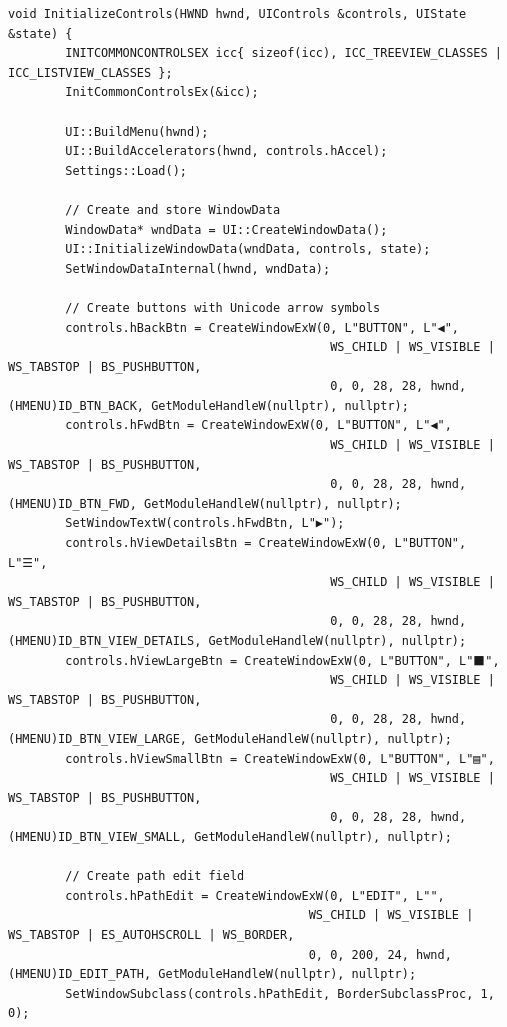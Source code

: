\begin{lstlisting}[style=CodeListing]
    void InitializeControls(HWND hwnd, UIControls &controls, UIState &state) {
        INITCOMMONCONTROLSEX icc{ sizeof(icc), ICC_TREEVIEW_CLASSES | ICC_LISTVIEW_CLASSES };
        InitCommonControlsEx(&icc);
        
        UI::BuildMenu(hwnd);
        UI::BuildAccelerators(hwnd, controls.hAccel);
        Settings::Load();
        
        // Create and store WindowData
        WindowData* wndData = UI::CreateWindowData();
        UI::InitializeWindowData(wndData, controls, state);
        SetWindowDataInternal(hwnd, wndData);
        
        // Create buttons with Unicode arrow symbols
        controls.hBackBtn = CreateWindowExW(0, L"BUTTON", L"◀", 
                                             WS_CHILD | WS_VISIBLE | WS_TABSTOP | BS_PUSHBUTTON,
                                             0, 0, 28, 28, hwnd, (HMENU)ID_BTN_BACK, GetModuleHandleW(nullptr), nullptr);
        controls.hFwdBtn = CreateWindowExW(0, L"BUTTON", L"◀",
                                             WS_CHILD | WS_VISIBLE | WS_TABSTOP | BS_PUSHBUTTON,
                                             0, 0, 28, 28, hwnd, (HMENU)ID_BTN_FWD, GetModuleHandleW(nullptr), nullptr);
        SetWindowTextW(controls.hFwdBtn, L"▶");
        controls.hViewDetailsBtn = CreateWindowExW(0, L"BUTTON", L"☰", 
                                             WS_CHILD | WS_VISIBLE | WS_TABSTOP | BS_PUSHBUTTON,
                                             0, 0, 28, 28, hwnd, (HMENU)ID_BTN_VIEW_DETAILS, GetModuleHandleW(nullptr), nullptr);
        controls.hViewLargeBtn = CreateWindowExW(0, L"BUTTON", L"⬛",
                                             WS_CHILD | WS_VISIBLE | WS_TABSTOP | BS_PUSHBUTTON,
                                             0, 0, 28, 28, hwnd, (HMENU)ID_BTN_VIEW_LARGE, GetModuleHandleW(nullptr), nullptr);
        controls.hViewSmallBtn = CreateWindowExW(0, L"BUTTON", L"▤",
                                             WS_CHILD | WS_VISIBLE | WS_TABSTOP | BS_PUSHBUTTON,
                                             0, 0, 28, 28, hwnd, (HMENU)ID_BTN_VIEW_SMALL, GetModuleHandleW(nullptr), nullptr);
        
        // Create path edit field
        controls.hPathEdit = CreateWindowExW(0, L"EDIT", L"",
                                          WS_CHILD | WS_VISIBLE | WS_TABSTOP | ES_AUTOHSCROLL | WS_BORDER,
                                          0, 0, 200, 24, hwnd, (HMENU)ID_EDIT_PATH, GetModuleHandleW(nullptr), nullptr);
        SetWindowSubclass(controls.hPathEdit, BorderSubclassProc, 1, 0);
        

\end{lstlisting}
